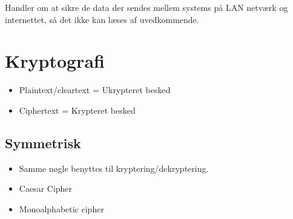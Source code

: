 Handler om at sikre de data der sendes mellem systems på LAN netværk og internettet, så det ikke kan læses af uvedkommende.

\section{Kryptografi}
\begin{itemize}
	\item Plaintext/cleartext = Ukrypteret besked
	\item Ciphertext = Krypteret besked
\end{itemize}


\subsection{Symmetrisk}
\begin{itemize}
	\item Samme nøgle benyttes til kryptering/dekryptering.
	\item Caesar Cipher
	\item Monoalphabetic cipher
\end{itemize}

